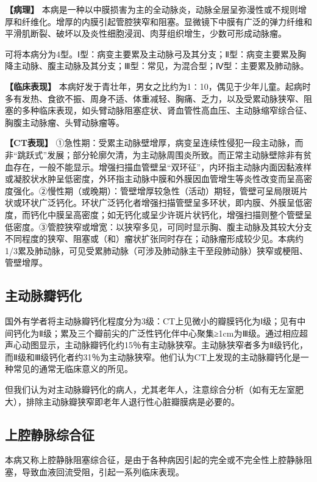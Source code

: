 \textbf{【病理】}
本病是一种以中膜损害为主的全动脉炎，动脉全层呈弥漫性或不规则增厚和纤维化。增厚的内膜引起管腔狭窄和阻塞。显微镜下中膜有广泛的弹力纤维和平滑肌断裂、破坏以及炎性细胞浸润、肉芽组织增生，少数可形成动脉瘤。

可将本病分为4型。Ⅰ型：病变主要累及主动脉弓及其分支；Ⅱ型：病变主要累及胸降主动脉、腹主动脉及其分支；Ⅲ型：常见，为混合型；Ⅳ型：主要累及肺动脉。

\textbf{【临床表现】}
本病好发于青壮年，男女之比约为1∶10，偶见于少年儿童。起病时多有发热、食欲不振、周身不适、体重减轻、胸痛、乏力，以及受累动脉狭窄、阻塞的多种临床表现，如头臂动脉阻塞症状、肾血管性高血压、主动脉缩窄综合征、胸腹主动脉瘤、头臂动脉瘤等。

\textbf{【CT表现】}
①急性期：受累主动脉壁增厚，病变呈连续性侵犯一段主动脉，而非“跳跃式”发展；部分轮廓欠清，为主动脉周围炎所致。而正常主动脉壁除非有贫血存在，一般不能显示。增强扫描血管壁呈“双环征”，内环指主动脉内面因黏液样或凝胶状水肿呈低密度，外环指主动脉中膜和外膜因血管增生等炎性改变而呈高密度强化。②慢性期（或晚期）：管壁增厚较急性（活动）期轻，管壁可呈局限斑片状或环状广泛钙化。环状广泛钙化者增强扫描管壁呈多环状，即内膜、外膜呈低密度，而钙化中膜呈高密度；如无钙化或呈少许斑片状钙化，增强扫描则整个管壁呈低密度。③管腔狭窄或增宽：以狭窄多见，可同时显示胸、腹主动脉及其较大分支不同程度的狭窄、阻塞或（和）瘤状扩张同时存在；动脉瘤形成较少见。本病约1/3累及肺动脉，可见受累肺动脉（可涉及肺动脉主干至段肺动脉）狭窄或梗阻、管壁增厚。

\subsection{主动脉瓣钙化}

国外有学者将主动脉瓣钙化程度分为3级：CT上见微小的瓣膜钙化为Ⅰ级；见有中间钙化为Ⅱ级；累及三个瓣前尖的广泛性钙化伴中心聚集≥1cm为Ⅲ级。通过相应超声心动图显示，主动脉瓣钙化约15％有主动脉狭窄。主动脉狭窄者多为Ⅱ级钙化，而Ⅱ级和Ⅲ级钙化者约31％为主动脉狭窄。他们认为CT上发现的主动脉瓣钙化是一种常见的通常无临床意义的所见。

但我们认为对主动脉瓣钙化的病人，尤其老年人，注意综合分析（如有无左室肥大），排除主动脉瓣狭窄即老年人退行性心脏瓣膜病是必要的。

\subsection{上腔静脉综合征}

本病又称上腔静脉阻塞综合征，是由于各种病因引起的完全或不完全性上腔静脉阻塞，导致血液回流受阻，引起一系列临床表现。

